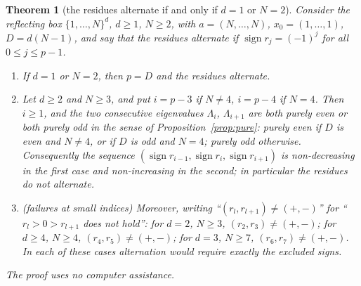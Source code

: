 \documentclass[11pt,a4paper]{article}
\theoremstyle{plain}
\newtheorem{theorem}{Theorem}[section]
\theoremstyle{definition}
\numberwithin{equation}{section}
\begin{document}
\begin{theorem}[the residues alternate if and only if $d=1$ or $N=2$]\label{thm:noalt}
Consider the reflecting box $\{1,\dots,N\}^d$, $d\ge1$, $N\ge2$, with $a=(N,\dots,N)$, $x_0=(1,\dots,1)$, $D=d(N-1)$, and say that the residues \emph{alternate} if $\operatorname{sign}r_j=(-1)^j$ for all $0\le j\le p-1$.
\begin{enumerate}
\item[(a)] If $d=1$ or $N=2$, then $p=D$ and the residues alternate.
\item[(b)] Let $d\ge2$ and $N\ge3$, and put $i=p-3$ if $N\ne4$, $i=p-4$ if $N=4$. Then $i\ge1$, and the two consecutive eigenvalues $\Lambda_i$, $\Lambda_{i+1}$ are both purely even or both purely odd in the sense of Proposition~\ref{prop:pure}: purely even if $D$ is even and $N\ne4$, or if $D$ is odd and $N=4$; purely odd otherwise. Consequently the sequence $(\operatorname{sign}r_{i-1},\operatorname{sign}r_i,\operatorname{sign}r_{i+1})$ is non-decreasing in the first case and non-increasing in the second; in particular the residues do not alternate.
\item[(c)] (failures at small indices) Moreover, writing ``$(r_l,r_{l+1})\ne(+,-)$'' for ``$r_l>0>r_{l+1}$ does not hold'': for $d=2$, $N\ge3$, $(r_2,r_3)\ne(+,-)$; for $d\ge4$, $N\ge4$, $(r_4,r_5)\ne(+,-)$; for $d=3$, $N\ge7$, $(r_6,r_7)\ne(+,-)$. In each of these cases alternation would require exactly the excluded signs.
\end{enumerate}
The proof uses no computer assistance.
\end{theorem}
\end{document}
